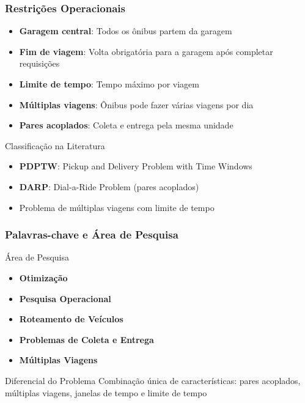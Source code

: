 \documentclass[10pt]{beamer}
\begin{document}
\begin{frame}
\frametitle{Restrições Operacionais}
\begin{itemize}
    \item \textbf{Garagem central}: Todos os ônibus partem da garagem
    \item \textbf{Fim de viagem}: Volta obrigatória para a garagem após completar requisições
    \item \textbf{Limite de tempo}: Tempo máximo por viagem
    \item \textbf{Múltiplas viagens}: Ônibus pode fazer várias viagens por dia
    \item \textbf{Pares acoplados}: Coleta e entrega pela mesma unidade
\end{itemize}

\vspace{0.5cm}
\begin{block}{Classificação na Literatura}
\begin{itemize}
    \item \textbf{PDPTW}: Pickup and Delivery Problem with Time Windows
    \item \textbf{DARP}: Dial-a-Ride Problem (pares acoplados)
    \item Problema de múltiplas viagens com limite de tempo
\end{itemize}
\end{block}
\end{frame}

\begin{frame}
\frametitle{Palavras-chave e Área de Pesquisa}
\begin{block}{Área de Pesquisa}
\begin{itemize}
    \item \textbf{Otimização}
    \item \textbf{Pesquisa Operacional}
    \item \textbf{Roteamento de Veículos}
    \item \textbf{Problemas de Coleta e Entrega}
    \item \textbf{Múltiplas Viagens}
\end{itemize}
\end{block}

\begin{alertblock}{Diferencial do Problema}
Combinação única de características: pares acoplados, múltiplas viagens, janelas de tempo e limite de tempo
\end{alertblock}
\end{frame}
\end{document}
